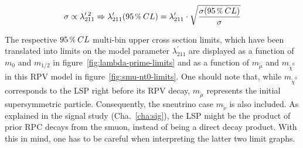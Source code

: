 \begin{equation}
  \label{eq:xs-lambda-scale}
  \sigma \propto \lambda^{\prime\:2}_{211} \Rightarrow \lambda^\prime_{211} (95\,\pct\: CL) = \lambda^\prime_{211} \cdot \sqrt{ \frac{\sigma (95\,\pct\: CL)}{\sigma} } 
\end{equation}

The respective $95\,\pct\: CL$ multi-bin upper cross section limits, which have been translated into limits on the model parameter $\lambda^{\prime}_{211}$ are displayed as a function of $m_0$ and $m_{1/2}$ in figure~\ref{fig:lambda-prime-limits} and as a function of $m_{\tilde{\mu}}$ and $m_{\tilde{\chi}^0}$ in this RPV model in figure~\ref{fig:smu-nt0-limits}. One should note that, while $m_{\tilde{\chi}^0}$ corresponds to the LSP right before its RPV decay, $m_{\tilde{\mu}}$ represents the initial supersymmetric particle. Consequently, the sneutrino case $m_{\tilde{\nu}}$ is also included. As explained in the signal study (Cha.~\ref{cha:sig}), the LSP might be the product of prior RPC decays from the smuon, instead of being a direct decay product. With this in mind, one has to be careful when interpreting the latter two limit graphs.


